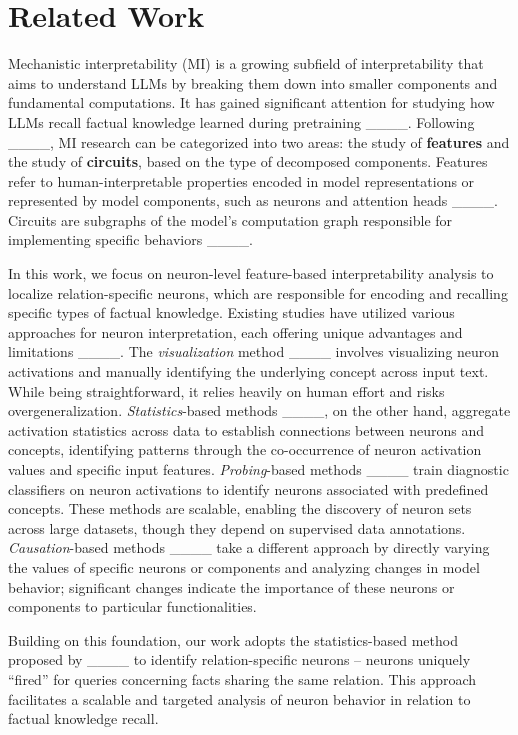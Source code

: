 \section{Related Work}
Mechanistic interpretability (MI) is a growing subfield of interpretability that aims to understand LLMs by breaking them down into smaller components and fundamental computations. It has gained significant attention for studying how LLMs recall factual knowledge learned during pretraining ____. 
Following ____, MI research can be categorized into two areas: the study of \textbf{features} and the study of \textbf{circuits}, based on the type of decomposed components. Features refer to human-interpretable properties encoded in model representations or represented by model components, such as neurons and attention heads ____. Circuits are subgraphs of the model's computation graph responsible for implementing specific behaviors 
____.

In this work, we focus on neuron-level feature-based interpretability analysis to localize relation-specific neurons, which are responsible for encoding and recalling specific types of factual knowledge. Existing studies have utilized various approaches for neuron interpretation, each offering unique advantages and limitations ____. The \textit{visualization} method ____ involves visualizing neuron activations and manually identifying the underlying concept across input text. While being straightforward, it relies heavily on human effort and risks overgeneralization. \textit{Statistics}-based methods ____, on the other hand, aggregate activation statistics across data to establish connections between neurons and concepts, identifying patterns through the co-occurrence of neuron activation values and specific input features. \textit{Probing}-based methods ____ train diagnostic classifiers on neuron activations to identify neurons associated with predefined concepts. These methods are scalable, enabling the discovery of neuron sets across large datasets, though they depend on supervised data annotations. \textit{Causation}-based methods ____ take a different approach by directly varying the values of specific neurons or components and analyzing changes in model behavior; significant changes indicate the importance of these neurons or components to particular functionalities. 

Building on this foundation, our work adopts the statistics-based method proposed by ____ to identify relation-specific neurons -- neurons uniquely ``fired'' for queries concerning facts sharing the same relation. This approach facilitates a scalable and targeted analysis of neuron behavior in relation to factual knowledge recall.


